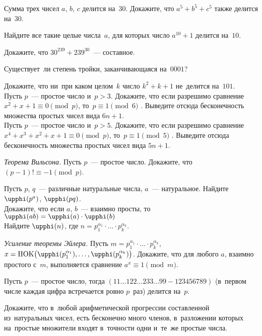 \begin{problems}

\item
Сумма трех чисел $a$, $b$, $c$ делится на~$30$.
Докажите, что $a^{5} + b^{5} + c^{5}$ также делится на~$30$.

\item
Найдите все такие целые числа~$a$, для которых число $a^{10} + 1$ делится
на~$10$.

\item
Докажите, что $30^{239} + 239^{30}$~--- составное.

\item
Существует~ли степень тройки, заканчивающаяся на~$0001$?

\item
\subproblem
Докажите, что ни~при каком целом~$k$ число $k^{2} + k + 1$ не~делится на~$101$.
\\
\subproblem
Пусть $p$~--- простое число и~$p > 3$.
Докажите, что если разрешимо сравнение $x^{2} + x + 1 \equiv 0 \pmod{p}$,
то~$p \equiv 1 \pmod{6}$ .
Выведите отсюда бесконечность множества простых чисел вида $6 n + 1$.
\\
\subproblem
Пусть $p$~--- простое число и~$p > 5$.
Докажите, что если разрешимо сравнение
$x^{4} + x^{3} + x^{2} + x + 1 \equiv 0 \pmod{p}$,
то~$p \equiv 1 \pmod{5}$ .
Выведите отсюда бесконечность множества простых чисел вида $5 n + 1$.

\item \emph{Теорема Вильсона.}
Пусть $p$~--- простое число.
Докажите, что $(p - 1)! \equiv -1 \pmod{p}$.

\item
\subproblem
Пусть $p$, $q$~--- различные натуральные числа, $a$~--- натуральное.
Найдите $\eulerphi(p^{a})$, $\eulerphi(pq)$.
\\
\subproblem
Докажите, что если $a$, $b$~--- взаимно просты,
то~$\eulerphi(a b) = \eulerphi(a) \cdot \eulerphi(b)$
\\
\subproblem
Найдите $\eulerphi(n)$, где
$n = p_{1}^{\alpha_{1}} \cdot \ldots \cdot p_{k}^{\alpha_{k}}$.

\item
\emph{Усиление теоремы Эйлера.}
Пусть $m = p_{1}^{\alpha_{1}} \cdot \ldots \cdot p_{k}^{\alpha_{k}}$,
\(
    x
=
    \text{HOK} \bigl(
        \eulerphi(p_{1}^{\alpha_{1}}),
        \ldots,
        \eulerphi(p_{k}^{\alpha_{k}})
    \bigr)
\).
Докажите, что для любого $a$, взаимно простого с~$m$, выполняется сравнение
$a^{x} \equiv 1 \pmod{m}$.

\item
Пусть $p$~--- простое число, тогда
$(11{\ldots}122{\ldots}233{\ldots}99 - 123456789)$
(в~первом числе каждая цифра встречается ровно $p$~раз) делится на~$p$.

\item
Докажите, что в~любой арифметической прогрессии составленной из~натуральных
чисел, есть бесконечно много членов, в~разложении которых на~простые множители
входят в~точности одни и~те~же простые числа.

\end{problems}

\endgroup %

